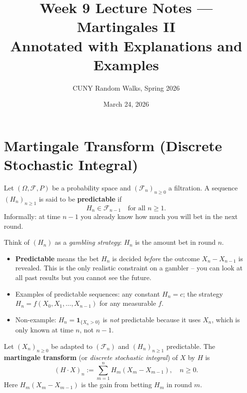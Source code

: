 \documentclass[12pt]{article}
\title{Week 9 Lecture Notes --- Martingales II\\
{\large Annotated with Explanations and Examples}}
\author{CUNY Random Walks, Spring 2026}
\date{March 24, 2026}
\newcommand{\F}{\mathcal{F}}
\newcommand{\1}{\mathbf{1}}
\begin{document}
\maketitle
\tableofcontents
\newpage

\section{Martingale Transform (Discrete Stochastic Integral)}

\begin{tcolorbox}[redbox={Definition: Predictable Sequence}]
Let $(\Omega, \F, P)$ be a probability space and $(\F_n)_{n \ge 0}$ a filtration.
A sequence $(H_n)_{n \ge 1}$ is said to be \textbf{predictable} if
\[
  H_n \in \F_{n-1} \quad \text{for all } n \ge 1.
\]
Informally: at time $n-1$ you already know how much you will bet in the next round.
\end{tcolorbox}

\begin{tcolorbox}[bluebox={Intuition: Predictability}]
Think of $(H_n)$ as a \emph{gambling strategy}: $H_n$ is the amount bet in round $n$.
\begin{itemize}
  \item \textbf{Predictable} means the bet $H_n$ is decided \emph{before} the outcome
        $X_n - X_{n-1}$ is revealed. This is the only realistic constraint on a gambler
        -- you can look at all past results but you cannot see the future.
  \item Examples of predictable sequences: any constant $H_n = c$; the strategy
        $H_n = f(X_0, X_1, \ldots, X_{n-1})$ for any measurable $f$.
  \item Non-example: $H_n = \1_{\{X_n > 0\}}$ is \emph{not} predictable because it
        uses $X_n$, which is only known at time $n$, not $n-1$.
\end{itemize}
\end{tcolorbox}

\begin{tcolorbox}[redbox={Definition: Martingale Transform}]
Let $(X_n)_{n \ge 0}$ be adapted to $(\F_n)$ and $(H_n)_{n \ge 1}$ predictable.
The \textbf{martingale transform} (or \emph{discrete stochastic integral}) of $X$ by $H$ is
\[
  (H \cdot X)_n := \sum_{m=1}^n H_m (X_m - X_{m-1}), \quad n \ge 0.
\]
Here $H_m(X_m - X_{m-1})$ is the gain from betting $H_m$ in round $m$.
\end{tcolorbox}
\end{document}
